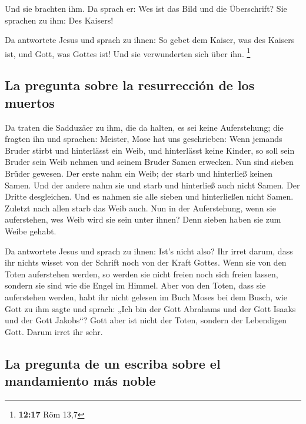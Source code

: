  Und sie brachten ihm. Da sprach er: Wes ist das Bild und
die Überschrift? Sie sprachen zu ihm: Des Kaisers!

 Da antwortete Jesus und sprach zu ihnen: So gebet dem
Kaiser, was des Kaisers ist, und Gott, was Gottes ist! Und sie
verwunderten sich über ihn. \footnote{\textbf{12:17} Röm 13,7}

\hypertarget{la-pregunta-sobre-la-resurrecciuxf3n-de-los-muertos}{%
\subsection{La pregunta sobre la resurrección de los
muertos}\label{la-pregunta-sobre-la-resurrecciuxf3n-de-los-muertos}}

 Da traten die Sadduzäer zu ihm, die da halten, es sei
keine Auferstehung; die fragten ihn und sprachen: 
Meister, Mose hat uns geschrieben: Wenn jemands Bruder stirbt und
hinterlässt ein Weib, und hinterlässt keine Kinder, so soll sein Bruder
sein Weib nehmen und seinem Bruder Samen erwecken.  Nun
sind sieben Brüder gewesen. Der erste nahm ein Weib; der starb und
hinterließ keinen Samen.  Und der andere nahm sie und
starb und hinterließ auch nicht Samen. Der Dritte desgleichen.
 Und es nahmen sie alle sieben und hinterließen nicht
Samen. Zuletzt nach allen starb das Weib auch.  Nun in
der Auferstehung, wenn sie auferstehen, wes Weib wird sie sein unter
ihnen? Denn sieben haben sie zum Weibe gehabt.

 Da antwortete Jesus und sprach zu ihnen: Ist's nicht
also? Ihr irret darum, dass ihr nichts wisset von der Schrift noch von
der Kraft Gottes.  Wenn sie von den Toten auferstehen
werden, so werden sie nicht freien noch sich freien lassen, sondern sie
sind wie die Engel im Himmel.  Aber von den Toten, dass
sie auferstehen werden, habt ihr nicht gelesen im Buch Moses bei dem
Busch, wie Gott zu ihm sagte und sprach: „Ich bin der Gott Abrahams und
der Gott Isaaks und der Gott Jakobs``?  Gott aber ist
nicht der Toten, sondern der Lebendigen Gott. Darum irret ihr sehr.

\hypertarget{la-pregunta-de-un-escriba-sobre-el-mandamiento-muxe1s-noble}{%
\subsection{La pregunta de un escriba sobre el mandamiento más
noble}\label{la-pregunta-de-un-escriba-sobre-el-mandamiento-muxe1s-noble}}

